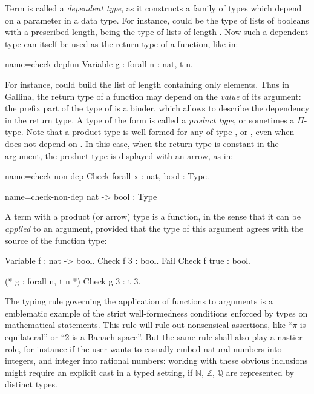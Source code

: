 Term  is called a \emph{dependent type}, as it constructs a
family of types which depend on a parameter in a data type. For
instance,  could be the type of lists of booleans with a
prescribed length,  being the type of lists of length
. Now such a dependent type can itself be used as the return type
of a function, like in: 

\begin{coq}{name=check-depfun}{}
Variable g : forall n : nat, t n.
\end{coq}

For instance,  could build the list of length  containing
only  elements.
Thus in Gallina, the return type of a function may depend on the
\emph{value} of its argument: the prefix  part of the
type of  is a binder, which allows to describe the dependency in
the return type. A type of the form  is called a
\emph{product type}, or sometimes a $\Pi$-type. Note that a product
type  is well-formed for any  of type ,
 or , even when  does not depend on . In this
case, when the return type is constant in the argument, the product
type is displayed with an arrow, as in:

\begin{coq-left}{name=check-non-dep}{}
Check forall x : nat, bool : Type.
\end{coq-left}
\begin{coqout-right}{name=check-non-dep}{}
nat -> bool : Type
\end{coqout-right}
  
A term with a product (or arrow) type is a function, in the sense that
it can be \emph{applied} to an argument, provided that the type of
this argument agrees with the source of the function type:

\begin{coq}{}{}
Variable f : nat -> bool.
Check f 3 : bool.
Fail Check f true : bool.

(* g : forall n, t n *)
Check g 3 : t 3.
\end{coq}

The typing rule governing the application of functions to arguments is
a emblematic example of the strict well-formedness conditions enforced
by types on mathematical statements. This rule will rule out
nonsensical assertions, like ``$\pi$ is equilateral'' or ``2 is a
Banach space''. But the same rule shall also play a nastier role, for
instance if the user wants to casually embed natural numbers into
integers, and integer into rational numbers: working with these
obvious inclusions might require an explicit cast in a typed setting,
if $\mathbb{N}$, $\mathbb{Z}$, $\mathbb{Q}$ are represented by
distinct types.


